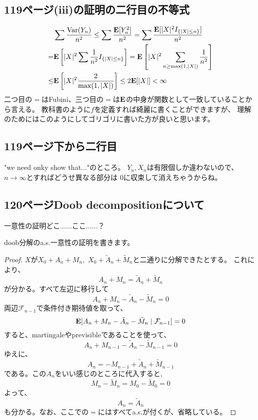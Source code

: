   \subsection{119ページ(iii)の証明の二行目の不等式}
    \begin{align*}
      &\sum \frac{{\text{Var}}(Y_n)}{n^2} \leq \sum \frac{{\mathbf{E}}[Y_n^2]}{n^2} = \sum \frac{{\mathbf{E}}[|X|^2 I_{\{|X| \leq n\}}]}{n^2} \\
      =& {\mathbf{E}}\left[|X|^2 \sum \frac{1}{n^2}I_{\{|X| \leq n\}}\right] = {\mathbf{E}}\left[|X|^2 \sum_{n \ge \max(1,|X|)} \frac{1}{n^2}\right] \\
      \leq& {\mathbf{E}}\left[|X|^2 \frac{2}{\max(1,|X|)}\right] \leq 2{\mathbf{E}}[|X|] < \infty
    \end{align*}
    二つ目の$=$はFubini、三つ目の$=$は${\mathbf{E}}$の中身が関数として一致していることから言える。
    教科書のように$f$を定義すれば綺麗に書くことができますが、
    理解のためにはこのようにしてゴリゴリに書いた方が良いと思います。

  \subsection{119ページ下から二行目}
    "we need onky show that..."のところ。
    $Y_n,X_n$は有限個しか違わないので、$n \to \infty$とすればどうせ異なる部分は
    $0$に収束して消えちゃうからね。

  \subsection{120ページDoob decompositionについて}
    一意性の証明どこ......ここ......？

    doob分解のa.s.一意性の証明を書きます。
    \begin{proof}
      $X$が$X_0 + A_n + M_n, \,\, X_0 + \tilde{A}_n + \tilde{M}_n$と二通りに分解できたとする。
      これにより、
      \[A_n + M_n = \tilde{A}_n + \tilde{M}_n\]
      が分かる。すべて左辺に移行して
      \[A_n + M_n - \tilde{A}_n - \tilde{M}_n = 0\]
      両辺$\mathcal{F}_{n-1}$で条件付き期待値を取って、
      \[{\mathbf{E}}[A_n + M_n - \tilde{A}_n - \tilde{M}_n \mid \mathcal{F}_{n-1}] = 0\]
      すると、martingaleやprevisibleであることを使って、
      \[A_n + M_{n-1} - \tilde{A}_n - \tilde{M}_{n-1} = 0\]
      ゆえに、
      \[A_n = - M_{n-1} + \tilde{A}_n + \tilde{M}_{n-1}\]
      である。この$A_n$をいい感じのところに代入すると,
      \[M_n  - \tilde{M}_n = M_0  - \tilde{M}_0 = 0 \]
      よって、
      \[A_n  = \tilde{A}_n\]
      も分かる。なお、ここでの$=$にはすべてa.s.が付くが、省略している。
    \end{proof}


